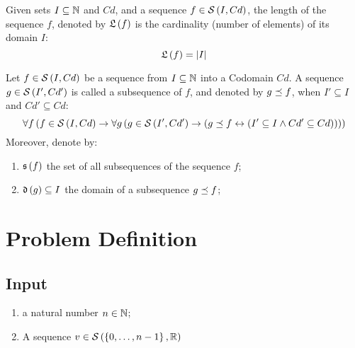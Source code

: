 \begin{defn}
    Given sets $I \subseteq \mathbb{N}$ and $Cd$, and a sequence $f \in \mathcal{S}\left( I, Cd \right)$, the length of the sequence $f$, denoted by $\mathfrak{L}\left(f\right)$ is the cardinality (number of elements) of its domain $I$:
    \begin{equation}
        \mathfrak{L}\left(f\right) = |I|
    \end{equation}
\end{defn}

\begin{defn}[Subsequence]
    Let $f \in \mathcal{S}\left( I, Cd \right)$ be a sequence from $I \subseteq \mathbb{N}$ into a Codomain $Cd$. A sequence $g \in \mathcal{S}\left( I', Cd' \right)$ is called a subsequence of $f$, and denoted by $g \preceq f$, when $I' \subseteq I$ and $Cd' \subseteq Cd$:
    \begin{equation}
        \forall f \left(
            f \in \mathcal{S}\left( I, Cd \right)
            \rightarrow
            \forall g \left(
                g \in \mathcal{S}\left( I', Cd' \right)
                \rightarrow
                \left(
                    g \preceq f \leftrightarrow \left(
                        I' \subseteq I
                        \land
                        Cd' \subseteq Cd
                    \right)
                \right)
            \right)
        \right)
    \end{equation}
    Moreover, denote by:
    \begin{enumerate}
        \item $\mathfrak{s}\left(f\right)$ the set of all subsequences of the sequence $f$;
        \item $\mathfrak{d}\left(g\right) \subseteq I$ the domain of a subsequence $g \preceq f$;
    \end{enumerate}
\end{defn}

\section{Problem Definition}

\subsection{Input}

\begin{enumerate}
    \item a natural number $n \in \mathbb{N}$;
    \item A sequence $v \in \mathcal{S}\left( \left\{ 0, \dots, n-1 \right\}, \mathbb{R} \right)$
\end{enumerate}

